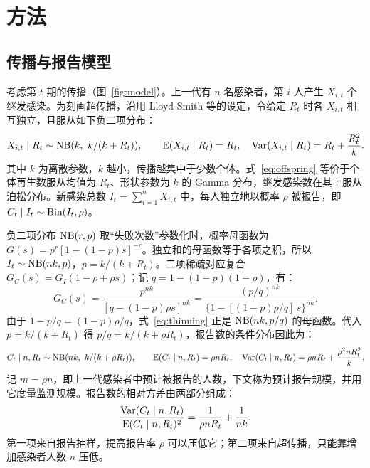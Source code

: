 \section{方法}
\label{sec:methods}

\subsection{传播与报告模型}
\label{sec:meth-model}

考虑第 $t$ 期的传播（图~\ref{fig:model}）。上一代有 $n$ 名感染者，第 $i$ 人产生 $X_{i,t}$ 个继发感染。为刻画超传播，沿用 Lloyd-Smith 等\citep{lloydsmith2005superspreading}的设定，令给定 $R_t$ 时各 $X_{i,t}$ 相互独立，且服从如下负二项分布：
\begin{equation}
  X_{i,t}\mid R_t \sim \operatorname{NB}(k,\ k/(k+R_t)),\qquad
  \operatorname{E}(X_{i,t}\mid R_t)=R_t,\quad \operatorname{Var}(X_{i,t}\mid R_t)=R_t+\frac{R_t^2}{k}.
  \label{eq:offspring}
\end{equation}
其中 $k$ 为离散参数，$k$ 越小，传播越集中于少数个体。式~\eqref{eq:offspring} 等价于个体再生数服从均值为 $R_t$、形状参数为 $k$ 的 Gamma 分布，继发感染数在其上服从泊松分布\citep{lloydsmith2005superspreading, endo2020estimating}。新感染总数 $I_t=\sum_{i=1}^{n}X_{i,t}$ 中，每人独立地以概率 $\rho$ 被报告，即 $C_t\mid I_t\sim\operatorname{Bin}(I_t,\rho)$。

负二项分布 $\operatorname{NB}(r,p)$ 取“失败次数”参数化时，概率母函数为 $G(s)=p^{r}[1-(1-p)s]^{-r}$。独立和的母函数等于各项之积，所以 $I_t\sim\operatorname{NB}(nk,p)$，$p=k/(k+R_t)$。二项稀疏对应复合 $G_C(s)=G_I(1-\rho+\rho s)$；记 $q=1-(1-p)(1-\rho)$，有：
\begin{equation}
  G_C(s)=\frac{p^{nk}}{[q-(1-p)\rho s]^{nk}}=\frac{(p/q)^{nk}}{\{1-[(1-p)\rho/q]\,s\}^{nk}}.
  \label{eq:thinning}
\end{equation}
由于 $1-p/q=(1-p)\rho/q$，式~\eqref{eq:thinning} 正是 $\operatorname{NB}(nk,p/q)$ 的母函数。代入 $p=k/(k+R_t)$ 得 $p/q=k/(k+\rho R_t)$，报告数的条件分布因此为：
\begin{equation}
  C_t\mid n, R_t \sim \operatorname{NB}(nk,\ k/(k+\rho R_t)),\qquad
  \operatorname{E}(C_t\mid n,R_t)=\rho n R_t,\quad
  \operatorname{Var}(C_t\mid n,R_t)=\rho n R_t+\frac{\rho^2 n R_t^2}{k}.
  \label{eq:report-dist}
\end{equation}
记 $m=\rho n$，即上一代感染者中预计被报告的人数，下文称为预计报告规模，并用它度量监测规模。报告数的相对方差由两部分组成：
\begin{equation}
  \frac{\operatorname{Var}(C_t\mid n,R_t)}{\operatorname{E}(C_t\mid n,R_t)^2}=\frac{1}{\rho n R_t}+\frac{1}{nk}.
  \label{eq:relvar}
\end{equation}
第一项来自报告抽样，提高报告率 $\rho$ 可以压低它；第二项来自超传播，只能靠增加感染者人数 $n$ 压低。

